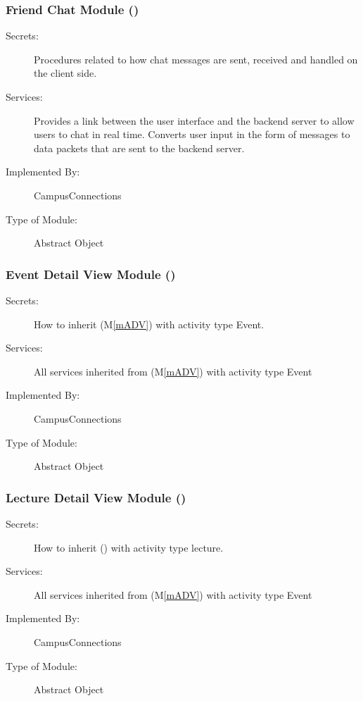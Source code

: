 \documentclass[12pt, titlepage]{article}
\newcommand{\mref}[1]{M\ref{#1}}
\begin{document}
  \subsubsection{Friend Chat Module (\label{mFC})}
  \begin{description}
  \item[Secrets:]Procedures related to how chat messages are sent, received and handled on the client side.
  \item[Services:]Provides a link between the user interface and the backend server to allow users to chat in real time. Converts user input in the form of messages to data packets that are sent to the backend server.
  \item[Implemented By:] CampusConnections
  \item[Type of Module:] Abstract Object
  \end{description}
  
  \subsubsection{Event Detail View Module (\label{mEDV})}
  \begin{description}
  \item[Secrets:]How to inherit (\mref{mADV}) with activity type Event.
  \item[Services:]All services inherited from (\mref{mADV}) with activity type Event
  \item[Implemented By:] CampusConnections
  \item[Type of Module:] Abstract Object
  \end{description}
  
  \subsubsection{Lecture Detail View Module (\label{mLDV})}
  \begin{description}
  \item[Secrets:]How to inherit (\label{mADV}) with activity type lecture.
  \item[Services:]All services inherited from (\mref{mADV}) with activity type Event
  \item[Implemented By:] CampusConnections
  \item[Type of Module:] Abstract Object
  \end{description}
  
\end{document}
